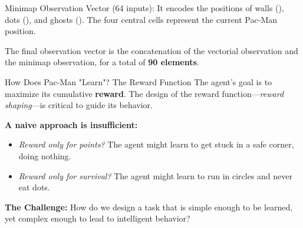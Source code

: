 \begin{frame}{Minimap Observation Vector (64 inputs):}
    It encodes the positions of walls (\small{}\normalsize), dots (\small{}\normalsize), and ghosts (\small{}\normalsize). The four central cells represent the current Pac-Man position.

    \vspace{0.5em}

    The final observation vector is the concatenation of the vectorial observation and the minimap observation, for a total of \textbf{90 elements}.
\end{frame}

\begin{frame}{How Does Pac-Man "Learn"? The Reward Function}
	The agent's goal is to maximize its cumulative \textbf{reward}. The design of the reward function—\textit{reward shaping}—is critical to guide its behavior.
	\vspace{1em}
	
	\textbf{A naive approach is insufficient:}
	\begin{itemize}
		\item \textit{Reward only for points?} The agent might learn to get stuck in a safe corner, doing nothing.
		\item \textit{Reward only for survival?} The agent might learn to run in circles and never eat dots.
	\end{itemize}
	
	\vspace{1em}
	\textbf{The Challenge:} How do we design a task that is simple enough to be learned, yet complex enough to lead to intelligent behavior?
	
\end{frame}

